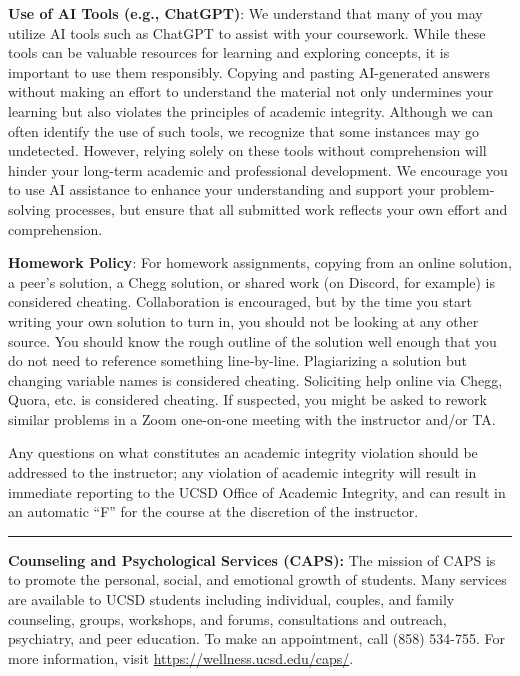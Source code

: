 \documentclass[12pt]{article}
\begin{document}
\noindent\textbf{Use of AI Tools (e.g., ChatGPT)}: We understand that many of you may utilize AI tools such as ChatGPT to assist with your coursework. 
While these tools can be valuable resources for learning and exploring concepts, it is important to use them responsibly. 
Copying and pasting AI-generated answers without making an effort to understand the material not only undermines your learning but also violates the principles of academic integrity. 
Although we can often identify the use of such tools, we recognize that some instances may go undetected. 
However, relying solely on these tools without comprehension will hinder your long-term academic and professional development. 
We encourage you to use AI assistance to enhance your understanding and support your problem-solving processes, but ensure that all submitted work reflects your own effort and comprehension.

\noindent\textbf{Homework Policy}:
For homework assignments, copying from an online solution, a peer's solution, a Chegg solution, or shared work (on Discord, for example) is considered cheating.
Collaboration is encouraged, but by the time you start writing your own solution to turn in, you should not be looking at any other source.
You should know the rough outline of the solution well enough that you do not need to reference something line-by-line.
Plagiarizing a solution but changing variable names is considered cheating.
Soliciting help online via Chegg, Quora, etc. is considered cheating.
If suspected, you might be asked to rework similar problems in a Zoom one-on-one meeting with the instructor and/or TA.

Any questions on what constitutes an academic integrity violation should be addressed to the instructor; any violation of academic integrity will result in immediate reporting to the UCSD Office of Academic Integrity, and can result in an automatic ``F'' for the course at the discretion of the instructor.

\begin{center}
  \rule{\textwidth}{0.5pt}
\end{center}

\noindent\textbf{Counseling and Psychological Services (CAPS):} The mission of CAPS is to promote the personal, social, and emotional growth of students.
Many services are available to UCSD students including individual, couples, and family counseling, groups, workshops, and forums, consultations and outreach, psychiatry, and peer education.
To make an appointment, call (858) 534-755.
For more information, visit \href{https://wellness.ucsd.edu/caps/}{https://wellness.ucsd.edu/caps/}.
\end{document}
